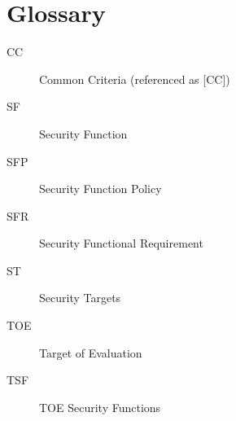 \documentclass[12pt,english]{scrbook}
\begin{document}



\chapter{Glossary}

\begin{description}

  \item[CC] Common Criteria (referenced as {[}CC])
  \item[SF] Security Function
  \item[SFP] Security Function Policy
  \item[SFR] Security Functional Requirement
  \item[ST] Security Targets
  \item[TOE] Target of Evaluation
  \item[TSF] TOE Security Functions

\end{description} 

\end{document}
